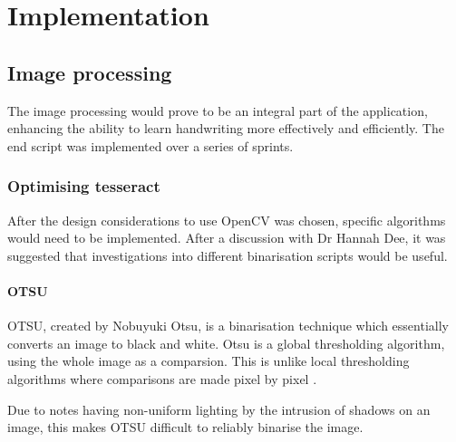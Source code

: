 \chapter{Implementation}




\section{Image processing} \label{imp:image_proces}
The image processing would prove to be an integral part of the application, enhancing the ability to learn handwriting more effectively and efficiently. The end script was implemented over a series of sprints.
\subsection{Optimising tesseract}
After the design considerations to use OpenCV was chosen, specific algorithms would need to be implemented. After a discussion with Dr Hannah Dee, it was suggested that investigations into different binarisation scripts would be useful.

\subsubsection{OTSU}
OTSU, created by Nobuyuki Otsu, is a binarisation technique which essentially converts an image to black and white. Otsu is a global thresholding algorithm, using the whole image as a comparsion. This is unlike local thresholding algorithms where comparisons are made pixel by pixel \cite{citeulike:6044081}.

Due to notes having non-uniform lighting by the intrusion of shadows on an image, this makes OTSU difficult to reliably binarise the image.

